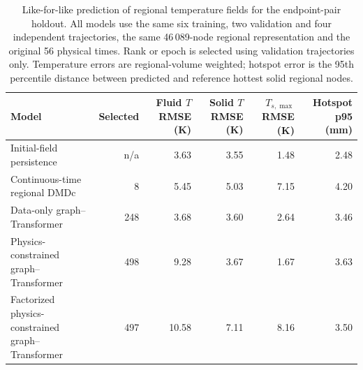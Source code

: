 \begin{table}[htbp]
\centering
\footnotesize
\setlength{\tabcolsep}{4pt}
\caption{Like-for-like prediction of regional temperature fields for the endpoint-pair holdout. All models use the same six training, two validation and four independent trajectories, the same 46\,089-node regional representation and the original 56 physical times. Rank or epoch is selected using validation trajectories only. Temperature errors are regional-volume weighted; hotspot error is the 95th percentile distance between predicted and reference hottest solid regional nodes.}
\label{tab:regional_dynamics}
\begin{tabular}{@{}lrrrrr@{}}
\toprule
Model & Selected & Fluid $T$ RMSE (K) & Solid $T$ RMSE (K) & $T_{s,\max}$ RMSE (K) & Hotspot p95 (mm) \\
\midrule
Initial-field persistence & n/a & 3.63 & 3.55 & 1.48 & 2.48 \\
Continuous-time regional DMDc & 8 & 5.45 & 5.03 & 7.15 & 4.20 \\
Data-only graph--Transformer & 248 & 3.68 & 3.60 & 2.64 & 3.46 \\
Physics-constrained graph--Transformer & 498 & 9.28 & 3.67 & 1.67 & 3.63 \\
Factorized physics-constrained graph--Transformer & 497 & 10.58 & 7.11 & 8.16 & 3.50 \\
\bottomrule
\end{tabular}
\end{table}
